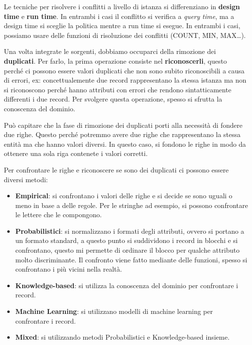 Le tecniche per risolvere i conflitti a livello di istanza si differenziano in
\textbf{design time} e \textbf{run time}. In entrambi i casi il conflitto si
verifica a \textit{query time}, ma a design time si sceglie la politica mentre a
run time si esegue. In entrambi i casi, possiamo usare delle funzioni di
risoluzione dei conflitti (COUNT, MIN, MAX\dots).

Una volta integrate le sorgenti, dobbiamo occuparci della rimozione dei \textbf{duplicati}.
Per farlo, la prima operazione consiste nel \textbf{riconoscerli}, questo perché ci possono
essere valori duplicati che non sono subito riconoscibili a causa di errori,
ex: concettualemente due record rappresentano la stessa istanza ma non si riconoscono
perché hanno attributi con errori che rendono sintatticamente differenti i due record.
Per svolgere questa operazione, spesso si sfrutta la conoscenza del dominio.

Può capitare che la fase di rimozione dei duplicati porti alla necessità di
fondere due righe. Questo perché potremmo avere due righe che rappresentano la
stessa entità ma che hanno valori diversi. In questo caso, si fondono le righe
in modo da ottenere una sola riga contenete i valori corretti.

Per confrontare le righe e riconoscere se sono dei duplicati ci possono essere diversi metodi:

\begin{itemize}
      \item \textbf{Empirical}: si confrontano i valori delle righe e si decide
            se sono uguali o meno in base a delle regole. Per le stringhe ad
            esempio, si possono confrontare le lettere che le compongono.
      \item \textbf{Probabilistici}: si normalizzano i formati degli attributi,
            ovvero si portano a un formato standard, a questo punto si suddividono
            i record in blocchi e si confrontano, questo mi permette di ordinare
            il blocco per qualche attributo molto discriminante. Il confronto viene
            fatto mediante delle funzioni, spesso si confrontano i più vicini
            nella realtà.
      \item \textbf{Knowledge-based}: si utilizza la conoscenza del dominio per
            confrontare i record.
      \item \textbf{Machine Learning}: si utilizzano modelli di machine learning
            per confrontare i record.
      \item \textbf{Mixed}: si utilizzando metodi Probabilistici e Knowledge-based
            insieme.
\end{itemize}
